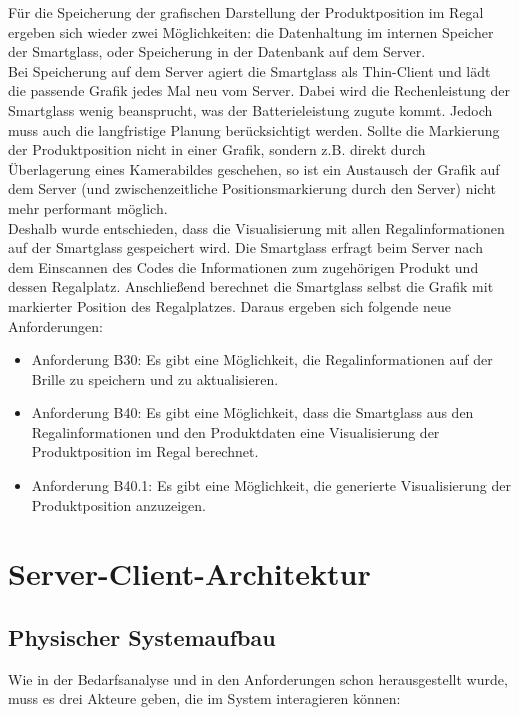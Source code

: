 Für die Speicherung der grafischen Darstellung der Produktposition im Regal ergeben sich wieder zwei Möglichkeiten: die Datenhaltung im internen Speicher der Smartglass, oder Speicherung in der Datenbank auf dem Server.\\
Bei Speicherung auf dem Server agiert die Smartglass als Thin-Client und lädt die passende Grafik jedes Mal neu vom Server. Dabei wird die Rechenleistung der Smartglass wenig beansprucht, was der Batterieleistung zugute kommt. Jedoch muss auch die langfristige Planung berücksichtigt werden. Sollte die Markierung der Produktposition nicht in einer Grafik, sondern z.B. direkt durch Überlagerung eines Kamerabildes geschehen, so ist ein Austausch der Grafik auf dem Server (und zwischenzeitliche Positionsmarkierung durch den Server) nicht mehr performant möglich.\\
Deshalb wurde entschieden, dass die Visualisierung mit allen Regalinformationen auf der Smartglass gespeichert wird. Die Smartglass erfragt beim Server nach dem Einscannen des Codes die Informationen zum zugehörigen Produkt und dessen Regalplatz. Anschließend berechnet die Smartglass selbst die Grafik mit markierter Position des Regalplatzes. Daraus ergeben sich folgende neue Anforderungen:

\begin{itemize}
	\item Anforderung B30: Es gibt eine Möglichkeit, die Regalinformationen auf der Brille zu speichern und zu aktualisieren. 
	\item Anforderung B40: Es gibt eine Möglichkeit, dass die Smartglass aus den Regalinformationen und den Produktdaten eine Visualisierung der Produktposition im Regal berechnet.
	\item Anforderung B40.1: Es gibt eine Möglichkeit, die generierte Visualisierung der Produktposition anzuzeigen.
\end{itemize}


\section{Server-Client-Architektur}
\label{sec:architektur_serverclient}

\subsection{Physischer Systemaufbau}

Wie in der Bedarfsanalyse und in den Anforderungen schon herausgestellt wurde, muss es drei Akteure geben, die im System interagieren können:

